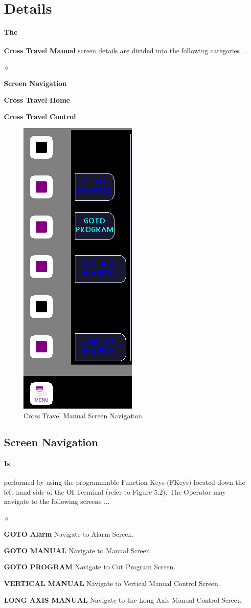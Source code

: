 \section{Details}\paragraph*{The}\textbf{Cross Travel Manual} screen details are divided into the following categories ...
\begin{list}{$\diamond$}{}
	\item \textbf{Screen Navigation}
	\item \textbf{Cross Travel Home}
	\item \textbf{Cross Travel Control}
\end{list}
\begin{figure}
	\centering
	\includegraphics[width=0.2\linewidth]{screen-captures/manual/trans-manual-nav}
	\caption{Cross Travel Manual Screen Navigation}
	\label{fig:manual-cross-screen-nav}
\end{figure}
\subsection{Screen Navigation}\paragraph*{Is}performed by using the programmable Function Keys (FKeys) located down the left hand side of the OI Terminal (refer to Figure 5.2). The Operator may navigate to the following screens ...
\begin{list}{$\diamond$}{}
	\item \textbf{GOTO Alarm} Navigate to Alarm Screen.
	\item \textbf{GOTO MANUAL} Navigate to Manual Screen.
	\item \textbf{GOTO PROGRAM} Navigate to Cut Program Screen.
	\item \textbf{VERTICAL MANUAL} Navigate to Vertical Manual Control Screen.
	\item \textbf{LONG AXIS MANUAL} Navigate to the Long Axis Manual Control Screen.
\end{list}
